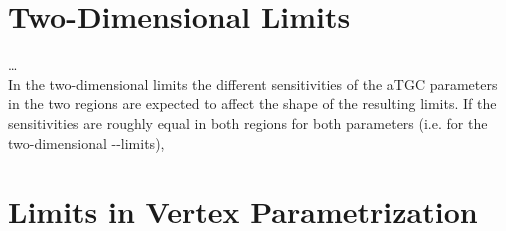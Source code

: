 \section{Two-Dimensional Limits}
\label{sec:2dlims}
\dots \\
\noindent In the two-dimensional limits the different sensitivities of the aTGC parameters in the two regions are expected to affect the shape of the resulting limits. If the sensitivities are roughly equal in both regions for both parameters (i.e. for the two-dimensional \Tcwww -\Tccw -limits), 
\section{Limits in Vertex Parametrization}
\label{sec:vertex}